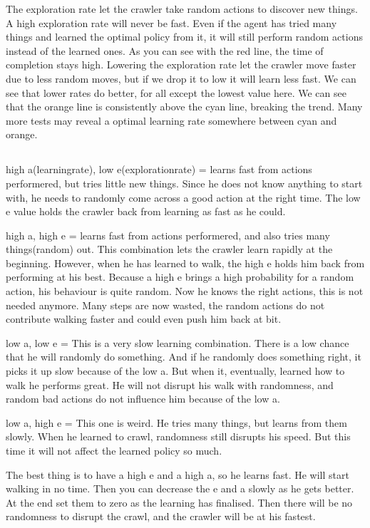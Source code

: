 The exploration rate let the crawler take random actions to discover 
new things. A high exploration rate will never be fast. Even if the 
agent has tried many things and learned the optimal policy from it, 
it will still perform random actions instead of the learned ones. 
As you can see with the red line, the time of completion stays high. 
Lowering the exploration rate let the crawler move faster due to less 
random moves, but if we drop it to low it will learn less fast. We 
can see that lower rates do better, for all except the lowest value here.
We can see that the orange line is consistently above the cyan line, 
breaking the trend. Many more tests may reveal a optimal learning rate 
somewhere between cyan and orange.

\subsection{}

high a(learningrate), low e(explorationrate) = learns fast from actions performered, but tries little new things.
Since he does not know anything to start with, he needs to randomly come across a good action at the right time.
The low e value holds the crawler back from learning as fast as he could.

high a, high e = learns fast from actions performered, and also tries many things(random) out.
This combination lets the crawler learn rapidly at the beginning. However, when he has learned to walk, the high e
holds him back from performing at his best. Because a high e brings a high probability for a random action, his
behaviour is quite random. Now he knows the right actions, this is not needed anymore. Many steps are now wasted, the random
actions do not contribute walking faster and could even push him back at bit.

low a, low e = This is a very slow learning combination. There is a low chance that he will randomly do something.
And if he randomly does something right, it picks it up slow because of the low a. But when it, eventually, learned how to walk
he performs great. He will not disrupt his walk with randomness, and random bad actions do not influence him because of
the low a.

low a, high e = This one is weird. He tries many things, but learns from them slowly. When he learned to crawl, randomness
still disrupts his speed. But this time it will not affect the learned policy so much.

The best thing is to have a high e and a high a, so he learns fast. He will start walking in no time. Then you can decrease
the e and a slowly as he gets better. At the end set them to zero as the learning has finalised. Then there will be no
randomness to disrupt the crawl, and the crawler will be at his fastest.

